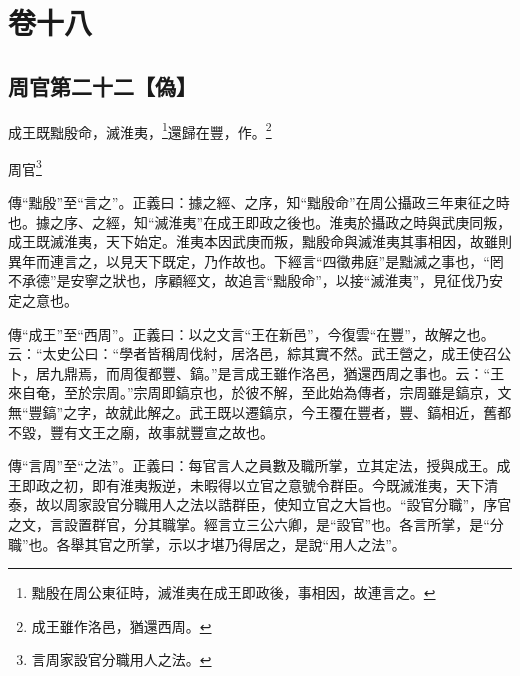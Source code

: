 

\chapter{卷十八}


\section{周官第二十二【偽】}


成王既黜殷命，滅淮夷，\footnote{黜殷在周公東征時，滅淮夷在成王即政後，事相因，故連言之。}還歸在豐，作。\footnote{成王雖作洛邑，猶還西周。}

周官\footnote{言周家設官分職用人之法。}


{\noindent\zhuan{}\fzbyks 傳“黜殷”至“言之”。正義曰：據之經、之序，知“黜殷命”在周公攝政三年東征之時也。據之序、之經，知“滅淮夷”在成王即政之後也。淮夷於攝政之時與武庚同叛，成王既滅淮夷，天下始定。淮夷本因武庚而叛，黜殷命與滅淮夷其事相因，故雖則異年而連言之，以見天下既定，乃作故也。下經言“四徵弗庭”是黜滅之事也，“罔不承德”是安寧之狀也，序顧經文，故追言“黜殷命”，以接“滅淮夷”，見征伐乃安定之意也。 \par}

{\noindent\zhuan{}\fzbyks 傳“成王”至“西周”。正義曰：以之文言“王在新邑”，今復雲“在豐”，故解之也。云：“太史公曰：“學者皆稱周伐紂，居洛邑，綜其實不然。武王營之，成王使召公卜，居九鼎焉，而周復都豐、鎬。”是言成王雖作洛邑，猶還西周之事也。云：“王來自奄，至於宗周。”宗周即鎬京也，於彼不解，至此始為傳者，宗周雖是鎬京，文無“豐鎬”之字，故就此解之。武王既以遷鎬京，今王覆在豐者，豐、鎬相近，舊都不毀，豐有文王之廟，故事就豐宣之故也。 \par}

{\noindent\zhuan{}\fzbyks 傳“言周”至“之法”。正義曰：每官言人之員數及職所掌，立其定法，授與成王。成王即政之初，即有淮夷叛逆，未暇得以立官之意號令群臣。今既滅淮夷，天下清泰，故以周家設官分職用人之法以誥群臣，使知立官之大旨也。“設官分職”，序官之文，言設置群官，分其職掌。經言立三公六卿，是“設官”也。各言所掌，是“分職”也。各舉其官之所掌，示以才堪乃得居之，是說“用人之法”。 \par}

